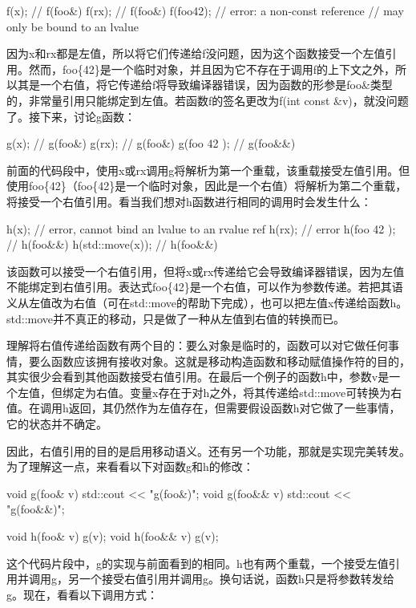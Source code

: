 \begin{cpp}
f(x); // f(foo&)
f(rx); // f(foo&)
f(foo{42}); // error: a non-const reference
            // may only be bound to an lvalue
\end{cpp}

因为x和rx都是左值，所以将它们传递给f没问题，因为这个函数接受一个左值引用。然而，foo\{42\}是一个临时对象，并且因为它不存在于调用f的上下文之外，所以其是一个右值，将它传递给f将导致编译器错误，因为函数的形参是foo\&类型的，非常量引用只能绑定到左值。若函数f的签名更改为f(int const \&v)，就没问题了。接下来，讨论g函数：

\begin{cpp}
g(x); // g(foo&)
g(rx); // g(foo&)
g(foo{ 42 }); // g(foo&&)
\end{cpp}

前面的代码段中，使用x或rx调用g将解析为第一个重载，该重载接受左值引用。但使用foo\{42\}（foo\{42\}是一个临时对象，因此是一个右值）将解析为第二个重载，将接受一个右值引用。看当我们想对h函数进行相同的调用时会发生什么：

\begin{cpp}
h(x); // error, cannot bind an lvalue to an rvalue ref
h(rx); // error
h(foo{ 42 }); // h(foo&&)
h(std::move(x)); // h(foo&&)
\end{cpp}

该函数可以接受一个右值引用，但将x或rx传递给它会导致编译器错误，因为左值不能绑定到右值引用。表达式foo\{42\}是一个右值，可以作为参数传递。若把其语义从左值改为右值（可在std::move的帮助下完成），也可以把左值x传递给函数h。std::move并不真正的移动，只是做了一种从左值到右值的转换而已。

理解将右值传递给函数有两个目的：要么对象是临时的，函数可以对它做任何事情，要么函数应该拥有接收对象。这就是移动构造函数和移动赋值操作符的目的，其实很少会看到其他函数接受右值引用。在最后一个例子的函数h中，参数v是一个左值，但绑定为右值。变量x存在于对h之外，将其传递给std::move可转换为右值。在调用h返回，其仍然作为左值存在，但需要假设函数h对它做了一些事情，它的状态并不确定。

因此，右值引用的目的是启用移动语义。还有另一个功能，那就是实现完美转发。为了理解这一点，来看看以下对函数g和h的修改：

\begin{cpp}
void g(foo& v) { std::cout << "g(foo&)\n"; }
void g(foo&& v) { std::cout << "g(foo&&)\n"; }

void h(foo& v) { g(v); }
void h(foo&& v) { g(v); }
\end{cpp}

这个代码片段中，g的实现与前面看到的相同。h也有两个重载，一个接受左值引用并调用g，另一个接受右值引用并调用g。换句话说，函数h只是将参数转发给g。现在，看看以下调用方式：


